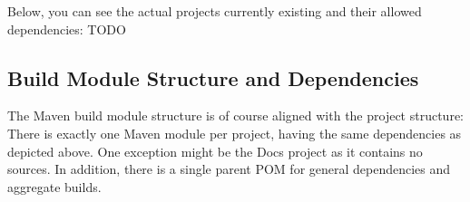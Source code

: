 Below, you can see the actual projects currently existing and their allowed dependencies:
TODO



\subsection{Build Module Structure and Dependencies}%
\label{sec:ModuleStructureandDependencies}%

The Maven build module structure is of course aligned with the project structure: There is exactly one Maven module per project, having the same dependencies as depicted above. One exception might be the Docs project as it contains no sources. In addition, there is a single parent POM for general dependencies and aggregate builds.


%
%

